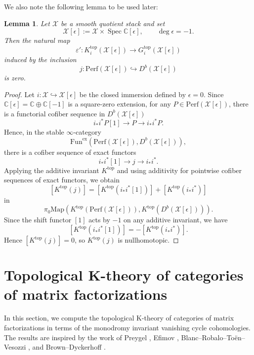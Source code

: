 \documentclass [11pt,oneside,a4paper,mathscr]{amsart}
\newtheorem{lemma}[thm]{Lemma}
\theoremstyle{definition}
\newcommand{\X}{\mathscr{X}}
\newcommand{\Spec}{\operatorname{Spec}}
\newcommand{\C}{\mathbb{C}}
\begin{document}
We also note the following lemma to be used later: 
\begin{lemma}\label{prop4zero}
Let $\X$ be a smooth quotient stack and set
\[
\X[\epsilon]:=\X\times \Spec \C[\epsilon],
\qquad \deg \epsilon=-1.
\]
Then the natural map
\[
\varepsilon' \colon
K_i^{\mathrm{top}}(\X[\epsilon])
\to
G_i^{\mathrm{top}}(\X[\epsilon])
\]
induced by the inclusion
\[
j\colon \mathrm{Perf}(\X[\epsilon])\hookrightarrow D^b(\X[\epsilon])
\]
is zero.
\end{lemma}

\begin{proof}
Let
$
i\colon \X\hookrightarrow \X[\epsilon]$
be the closed immersion defined by $\epsilon=0$.
Since $\C[\epsilon]=\C\oplus \C[-1]$ is a square-zero extension, for any
$P\in \mathrm{Perf}(\X[\epsilon])$, there is a functorial cofiber sequence in
$D^b(\X[\epsilon])$
\[
i_*i^*P[1]\to P\to i_*i^*P.
\]
Hence, in the stable $\infty$-category
\[
\mathrm{Fun}^{\mathrm{ex}}(\mathrm{Perf}(\X[\epsilon]),D^b(\X[\epsilon])),
\]
there is a cofiber sequence of exact functors
\[
i_*i^*[1]\to j\to i_*i^*.
\]
Applying the additive invariant $K^{\mathrm{top}}$ and using additivity for
pointwise cofiber sequences of exact functors, we obtain
\[
[K^{\mathrm{top}}(j)]
=
[K^{\mathrm{top}}(i_*i^*[1])]
+
[K^{\mathrm{top}}(i_*i^*)]
\]
in
\[
\pi_0\mathrm{Map}(
K^{\mathrm{top}}(\mathrm{Perf}(\X[\epsilon])),
K^{\mathrm{top}}(D^b(\X[\epsilon]))
).
\]
Since the shift functor $[1]$ acts by $-1$ on any additive invariant, we have
\[
[K^{\mathrm{top}}(i_*i^*[1])]
=
-[K^{\mathrm{top}}(i_*i^*)].
\]
Hence
$
[K^{\mathrm{top}}(j)]=0$,
so $K^{\mathrm{top}}(j)$ is nullhomotopic.
\end{proof}



\section{Topological K-theory of categories of matrix factorizations}\label{s4}





In this section, we compute the topological K-theory of categories of matrix factorizations in terms of the monodromy invariant vanishing cycle cohomologies. The results are inspired by the work of Preygel \cite[Section 6]{Preygelthesis}, Efimov \cite{Eff}, Blanc--Robalo--Toën--Vesozzi \cite{BRTV}, and Brown--Dyckerhoff \cite{BD}.
\smallskip
\end{document}

